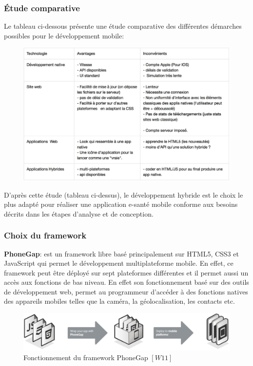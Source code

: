 \subsubsection{\'Etude comparative}

Le tableau ci-dessous présente une étude comparative des différentes démarches possibles pour le développement mobile:

\begin{figure}[!ht]
\begin{center}
\includegraphics[scale=0.32]{etude.jpg}
\end{center}
\end{figure}

D’après cette étude (tableau ci-dessus), le développement hybride est le choix le plus adapté pour réaliser une application e-santé mobile conforme aux besoins décrits dans les étapes d'analyse et de conception.

\newpage

\subsubsection{Choix du framework}

\textbf{PhoneGap}: est un framework libre basé principalement sur HTML5, CSS3 et JavaScript qui permet le
développement multiplateforme mobile. En effet, ce framework peut être déployé sur sept plateformes différentes et il permet aussi un accès aux fonctions de bas niveau. En effet son fonctionnement basé sur des outils de développement web, permet au programmeur d’accéder à des fonctions natives des appareils mobiles telles que la caméra, la géolocalisation, les contacts etc.

\begin{figure}[!ht]
\begin{center}
\includegraphics[scale=0.3]{p1.jpg}
\caption{Fonctionnement du framework PhoneGap $[W11]$}
\label{p1}
\end{center}
\end{figure}

